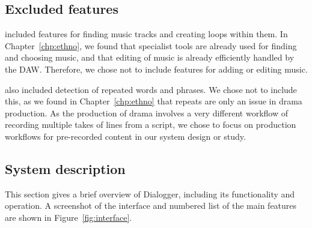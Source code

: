 \subsection{Excluded features}


\citet{Rubin2013} included features for finding music tracks and creating loops within them.  In
Chapter~\ref{chp:ethno}, we found that specialist tools are already used for finding and choosing music, and that
editing of music is already efficiently handled by the DAW. Therefore, we chose not to include features for adding or
editing music. 

\citet{Rubin2013} also included detection of repeated words and phrases. We chose not to include this, as we found in
Chapter~\ref{chp:ethno} that repeats are only an issue in drama production. As the production of drama involves a very
different workflow of recording multiple takes of lines from a script, we chose to focus on production workflows for
pre-recorded content in our system design or study.


\subsection{System description}

This section gives a brief overview of Dialogger, including its functionality and operation.  A screenshot of the
interface and numbered list of the main features are shown in Figure~\ref{fig:interface}.

